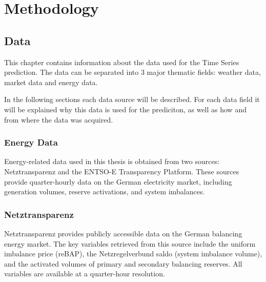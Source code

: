 \documentclass[class=scrbook, crop=false]{standalone}
\begin{document}
\chapter{Methodology} %
\label{Chapter::Methodology}

\section{Data}
\label{Chapter::Data}
This chapter contains information about the data used for the Time Series prediction. 
The data can be separated into 3 major thematic fields: weather data, market data and energy data.

In the following sections each data source will be described. 
For each data field it will be explained why this data is used for the prediciton, as well as  how and from where the data was acquired.



\subsection{Energy Data}
\label{Section::Energy_Data}

Energy-related data used in this thesis is obtained from two sources: Netztransparenz and the ENTSO-E Transparency Platform. 
These sources provide quarter-hourly data on the German electricity market, including generation volumes, reserve activations, and system imbalances.
\subsection{Netztransparenz}

Netztransparenz provides publicly accessible data on the German balancing energy market. The key variables retrieved from this source include the uniform imbalance price (reBAP), the Netzregelverbund saldo (system imbalance volume), and the activated volumes of primary and secondary balancing reserves. All variables are available at a quarter-hour resolution.
\end{document}
